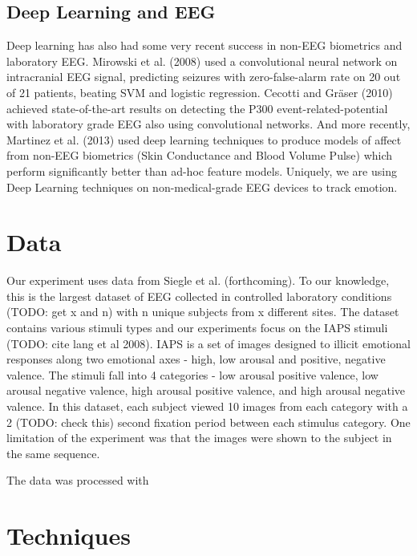 \documentclass{article} %
\begin{document}
\subsection{Deep Learning and EEG}
Deep learning has also had some very recent success in non-EEG biometrics and laboratory EEG. Mirowski et al. (2008) used a convolutional neural network on intracranial EEG signal, predicting seizures with zero-false-alarm rate on 20 out of 21 patients, beating SVM and logistic regression. Cecotti and Gräser (2010) achieved state-of-the-art results on detecting the P300 event-related-potential with laboratory grade EEG also using convolutional networks. And more recently, Martinez et al.
(2013) used deep learning techniques to produce models of affect from non-EEG biometrics (Skin Conductance and Blood Volume Pulse) which perform significantly better than ad-hoc feature models.
Uniquely, we are using Deep Learning techniques on non-medical-grade EEG devices to track emotion.

\section{Data} \label{section:data}
Our experiment uses data from Siegle et al. (forthcoming). To our knowledge, this is the largest dataset of EEG collected in controlled laboratory conditions (TODO: get x and n) with n unique subjects from x different sites. The dataset contains various stimuli types and our experiments focus on the IAPS stimuli (TODO: cite lang et al 2008). IAPS is a set of images designed to illicit emotional responses along two emotional axes - high, low arousal and positive, negative valence. The stimuli
fall into 4 categories - low arousal positive valence, low arousal negative valence, high arousal positive valence, and high arousal negative valence. In this dataset, each subject viewed 10 images from each category with a 2 (TODO: check this) second fixation period between each stimulus category. One limitation of the experiment was that the images were shown to the subject in the same sequence.

The data was processed with %

\section{Techniques} \label{section:techniques}
\end{document}
